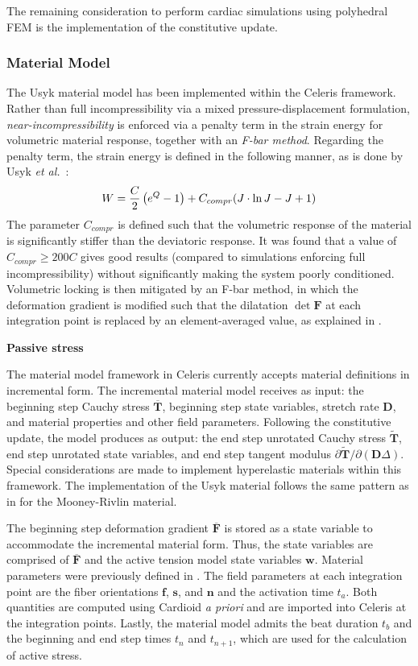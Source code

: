 The remaining consideration to perform cardiac simulations using polyhedral FEM is the implementation of the constitutive update.

\subsubsection{Material Model}
The Usyk material model has been implemented within the Celeris framework. Rather than full incompressibility via a mixed pressure-displacement formulation, \textit{near-incompressibility} is enforced via a penalty term in the strain energy for volumetric material response, together with an \textit{F-bar method}. Regarding the penalty term, the strain energy is defined in the following manner, as is done by Usyk \textit{et al.}~\cite{usyk_2002}:
\begin{equation}
W = \frac{C}{2}\left(e^Q -1\right) + C_{compr} (J \cdot \ln J - J + 1) \\
\end{equation}
The parameter $C_{compr}$ is defined such that the volumetric response of the material is significantly stiffer than the deviatoric response. It was found that a value of \mbox{$C_{compr} \geq 200  C$} gives good results (compared to simulations enforcing full incompressibility) without significantly making the system poorly conditioned. Volumetric locking is then mitigated by an F-bar method, in which the deformation gradient is modified such that the dilatation $\det\bm{F}$ at each integration point is replaced by an element-averaged value, as explained in .

\textbf{Passive stress}

The material model framework in Celeris currently accepts material definitions in incremental form. The incremental material model receives as input: the beginning step Cauchy stress $\overline{\bm{T}}$, beginning step state variables, stretch rate $\bm{D}$, and material properties and other field parameters. Following the constitutive update, the model produces as output: the end step unrotated Cauchy stress $\tilde{\bm{T}}$, end step unrotated state variables, and end step tangent modulus ${\partial \tilde{\bm{T}}}/{\partial (\bm{D}\Delta)}$. Special considerations are made to implement hyperelastic materials within this framework. The implementation of the Usyk material follows the same pattern as in  for the Mooney-Rivlin material.

The beginning step deformation gradient $\overline{\bm{F}}$ is stored as a state variable to accommodate the incremental material form. Thus, the state variables are comprised of $\overline{\bm{F}}$ and the active tension model state variables $\bm{w}$. Material parameters were previously defined in . The field parameters at each integration point are the fiber orientations $\bm{f}$, $\bm{s}$, and $\bm{n}$ and the activation time $t_a$. Both quantities are computed using Cardioid \textit{a priori} and are imported into Celeris at the integration points. Lastly, the material model admits the beat duration $t_b$ and the beginning and end step times $t_n$ and $t_{n+1}$, which are used for the calculation of active stress.


